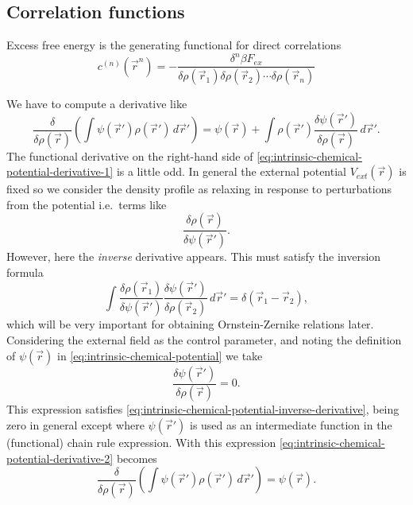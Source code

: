 \subsection{Correlation functions}

Excess free energy is the generating functional for direct correlations
\begin{equation}\label{eq:direct-correlations}
  c^{(n)}(\vec{r}^n) =
  - \frac{\delta^n \beta F_{ex}}{\delta \rho(\vec{r}_1)\delta \rho(\vec{r}_2) \cdots \delta \rho(\vec{r}_n)}
\end{equation}

We have to compute a derivative like
\begin{equation}\label{eq:intrinsic-chemical-potential-derivative-1}
  \frac{\delta}{\delta\rho(\vec{r})}
  \left(
  \int \psi(\vec{r}') \rho(\vec{r}') \, d\vec{r}'
  \right)
  =
  \psi(\vec{r}) +
  \int
  \rho(\vec{r}') \frac{\delta\psi(\vec{r}')}{\delta\rho(\vec{r})}
  \, d\vec{r}'.
\end{equation}
The functional derivative on the right-hand side of \eqref{eq:intrinsic-chemical-potential-derivative-1} is a little odd.
In general the external potential $V_{ext}(\vec{r})$%
is fixed so we consider the density profile as relaxing in response to perturbations from the potential i.e.\ terms like \[ \frac{\delta \rho(\vec{r})}{\delta \psi(\vec{r}')}. \]
However, here the \emph{inverse} derivative appears.
This must satisfy the inversion formula
\begin{equation}\label{eq:intrinsic-chemical-potential-inverse-derivative}
  \int
  \frac{\delta \rho(\vec{r}_1)}{\delta \psi(\vec{r}')}
  \frac{\delta \psi(\vec{r}')}{\delta \rho(\vec{r}_2)}
  \, d\vec{r}' =
  \delta(\vec{r}_1 - \vec{r}_2),
\end{equation}
which will be very important for obtaining Ornstein-Zernike relations later.
Considering the external field as the control parameter, and noting the definition of $\psi(\vec{r})$ in \eqref{eq:intrinsic-chemical-potential} we take
\begin{equation*}
  \frac{\delta\psi(\vec{r}')}{\delta\rho(\vec{r})} = 0.
\end{equation*}
This expression satisfies \eqref{eq:intrinsic-chemical-potential-inverse-derivative}, being zero in general except where $\psi(\vec{r}')$ is used as an intermediate function in the (functional) chain rule expression.
With this expression \eqref{eq:intrinsic-chemical-potential-derivative-2} becomes
\begin{equation}\label{eq:intrinsic-chemical-potential-derivative-2}
  \frac{\delta}{\delta\rho(\vec{r})}
  \left(
  \int \psi(\vec{r}') \rho(\vec{r}') \, d\vec{r}'
  \right)
  =
  \psi(\vec{r}).
\end{equation}

